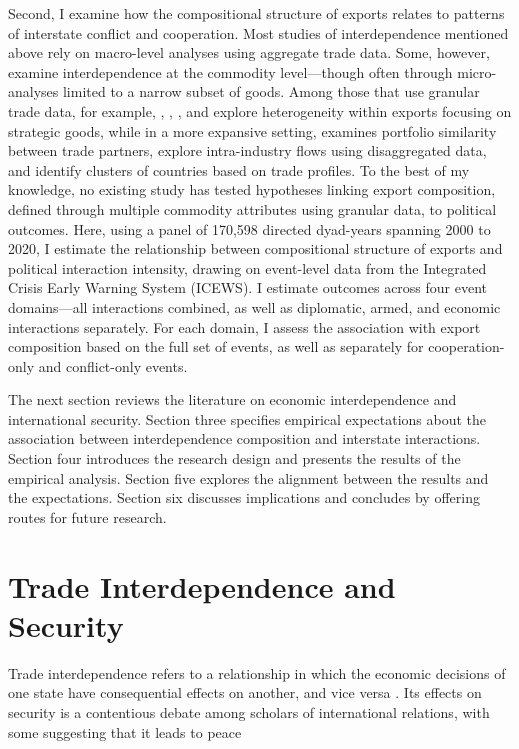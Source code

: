 \documentclass[12pt]{article}
\begin{document}
Second, I examine how the compositional structure of exports relates to patterns of interstate conflict and cooperation. Most studies of interdependence mentioned above rely on macro-level analyses using aggregate trade data. Some, however, examine interdependence at the commodity level—though often through micro-analyses limited to a narrow subset of goods. Among those that use granular trade data, for example, \textcite{reuveny1998bilateral}, \textcite{dorussen2006heterogeneous}, \textcite{goenner2010toys}, and \textcite{zeng2024microchips} explore heterogeneity within exports focusing on strategic goods, while in a more expansive setting, \textcite{chatagnier2017} examines portfolio similarity between trade partners, \textcite{peterson2016} explore intra-industry flows using disaggregated data, and \textcite{kim2020measuring} identify clusters of countries based on trade profiles. To the best of my knowledge, no existing study has tested hypotheses linking export composition, defined through multiple commodity attributes using granular data, to political outcomes. Here, using a panel of 170,598 directed dyad-years spanning 2000 to 2020, I estimate the relationship between compositional structure of exports and political interaction intensity, drawing on event-level data from the Integrated Crisis Early Warning System (ICEWS). I estimate outcomes across four event domains—all interactions combined, as well as diplomatic, armed, and economic interactions separately. For each domain, I assess the association with export composition based on the full set of events, as well as separately for cooperation-only and conflict-only events.


The next section reviews the literature on economic interdependence and international security. Section three specifies empirical expectations about the association between interdependence composition and interstate interactions. Section four introduces the research design and presents the results of the empirical analysis. Section five explores the alignment between the results and the expectations. Section six discusses implications and concludes by offering routes for future research. 

\section{Trade Interdependence and Security}
Trade interdependence refers to a relationship in which the economic decisions of one state have consequential effects on another, and vice versa \parencites{hirschman1980, keohane2012power}. Its effects on security is a contentious debate among scholars of international relations, with some suggesting that it leads to peace \parencites{}
\end{document}
